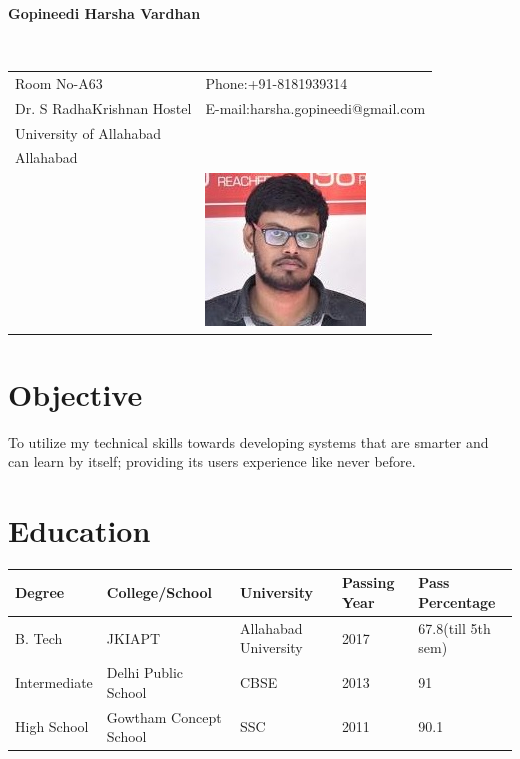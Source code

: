\documentclass[12pt]{article}
\begin{document}
\vspace{0.5in}
\begin{center}\begin{large}\textbf{Gopineedi Harsha Vardhan}\end{large}\end{center}\textbf{\hrulefill}\\

\begin{tabular}{@{}p{4in}p{3in}}
Room No-A63 & {Phone:}+91-8181939314 \\
Dr. S RadhaKrishnan Hostel & {E-mail:}harsha.gopineedi@gmail.com\\
University of Allahabad \\
Allahabad\\
& \includegraphics[scale=0.8]{harsha.jpg}\\
\end{tabular}

\section*{Objective}
To utilize my technical skills towards developing systems that are smarter and can learn by itself; providing its users experience like never before.   
\section*{Education}
\begin{tabular}{|l|l|l|l|l|}
\hline
Degree & College/School & University & Passing Year & Pass Percentage\\
\hline
B. Tech & JKIAPT & Allahabad University & 2017 & 67.8(till 5th sem)\\
\hline
Intermediate & Delhi Public School & CBSE & 2013 & 91\\
\hline
High School & Gowtham Concept School & SSC & 2011 & 90.1\\
\hline
\end{tabular}
\end{document}
